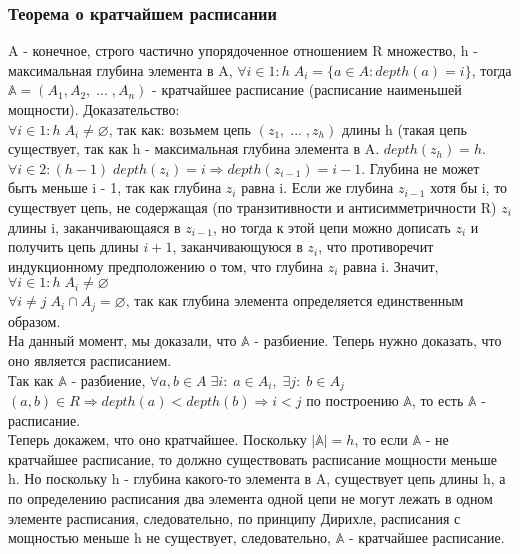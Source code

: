 \subsubsection{Теорема о кратчайшем расписании}
A - конечное, строго частично упорядоченное отношением R множество, h - максимальная глубина элемента в A, $\forall i \in 1:h \; A_i = \{a \in A: depth(a) = i\}$, тогда $\mathbb{A} = (A_1, A_2, \; ... \;, A_n)$ - кратчайшее расписание (расписание наименьшей мощности). Доказательство: \\
$\forall i \in 1:h \; A_i \not= \varnothing$, так как: возьмем цепь $(z_1, \; ... \; , z_h)$ длины h (такая цепь существует, так как h - максимальная глубина элемента в A. $depth(z_h) = h$. $\forall i \in 2:(h-1) \;depth(z_i) = i \Rightarrow depth(z_{i - 1}) = i - 1$. Глубина не может быть меньше i - 1, так как глубина $z_i$ равна i. Если же глубина $z_{i - 1}$ хотя бы i, то существует цепь, не содержащая (по транзитивности и антисимметричности R) $z_i$ длины i, заканчивающаяся в $z_{i - 1}$, но тогда к этой цепи можно дописать $z_i$ и получить цепь длины $i + 1$, заканчивающуюся в $z_i$, что противоречит индукционному предположению о том, что глубина $z_i$ равна i. Значит, $\forall i \in 1:h \; A_i \not= \varnothing$ \\
$\forall i \not= j \; A_i \cap A_j = \varnothing$, так как глубина элемента определяется единственным образом. \\
На данный момент, мы доказали, что $\mathbb{A}$ - разбиение. Теперь нужно доказать, что оно является расписанием. \\
Так как $\mathbb{A}$ - разбиение, $\forall a, b \in A \; \exists i : \; a \in A_i, \; \exists j : \; b \in A_j$ \\
$(a, b) \in R \Rightarrow depth(a) < depth(b) \Rightarrow i < j$ по построению $\mathbb{A}$, то есть $\mathbb{A}$ - расписание.\\
Теперь докажем, что оно кратчайшее. Поскольку $|\mathbb{A}| = h$, то если $\mathbb{A}$ - не кратчайшее расписание, то должно существовать расписание мощности меньше h. Но поскольку h - глубина какого-то элемента в A, существует цепь длины h, а по определению расписания два элемента одной цепи не могут лежать в одном элементе расписания, следовательно, по принципу Дирихле, расписания с мощностью меньше h не существует, следовательно, $\mathbb{A}$ - кратчайшее расписание.
